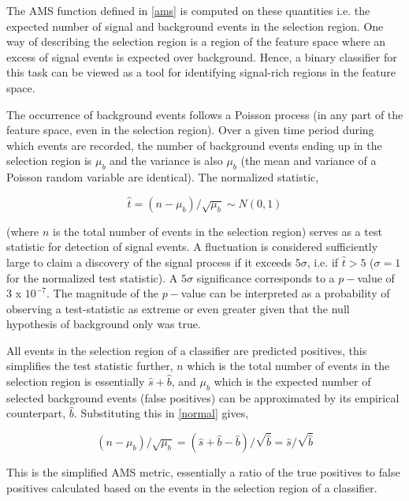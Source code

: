 The AMS function defined in \ref{ams} is computed on these quantities i.e. the expected number of signal and background events in the selection region. One way of describing the selection region is a region of the feature space where an excess of signal events is expected over background. Hence, a binary classifier for this task can be viewed as a tool for identifying signal-rich regions in the feature space. 

The occurrence of background events follows a Poisson process (in any part of the feature space, even in the selection region). Over a given time period during which events are recorded, the number of background events ending up in the selection region is $\mu_{b}$ and the variance is also $\mu_{b}$ (the mean and variance of a Poisson random variable are identical). The normalized statistic, 

\begin{equation} \hat{t} = (n-\mu_{b})/\sqrt{\mu_{b}} \sim N(0,1) 
\label{normal}
\end{equation} 

(where $n$ is the total number of events in the selection region) serves as a test statistic for detection of signal events. A fluctuation is considered sufficiently large to claim a discovery of the signal process if it exceeds $5\sigma$, i.e. if $\hat{t} > 5$ ($\sigma = 1$ for the normalized test statistic). A $5\sigma$ significance corresponds to a $p-$value of $3$ x $10^{-7}$. The magnitude of the $p-$value can be interpreted as a probability of observing a test-statistic as extreme or even greater given that the null hypothesis of background only was true. 

All events in the selection region of a classifier are predicted positives, this simplifies the test statistic further, $n$ which is the total number of events in the selection region is essentially $\hat{s}+\hat{b}$, and $\mu_{b}$ which is the expected number of selected background events (false positives) can be approximated by its empirical counterpart, $\hat{b}$. Substituting this in \ref{normal} gives, 

\begin{equation}
(n-\mu_{b})/\sqrt{\mu_{b}} = ( \hat{s} + \hat{b} - \hat{b})/\sqrt{\hat{b}} = \hat{s}/\sqrt{\hat{b}}
\label{simple}
\end{equation}

This is the simplified AMS metric, essentially a ratio of the true positives to false positives calculated based on the events in the selection region of a classifier.

